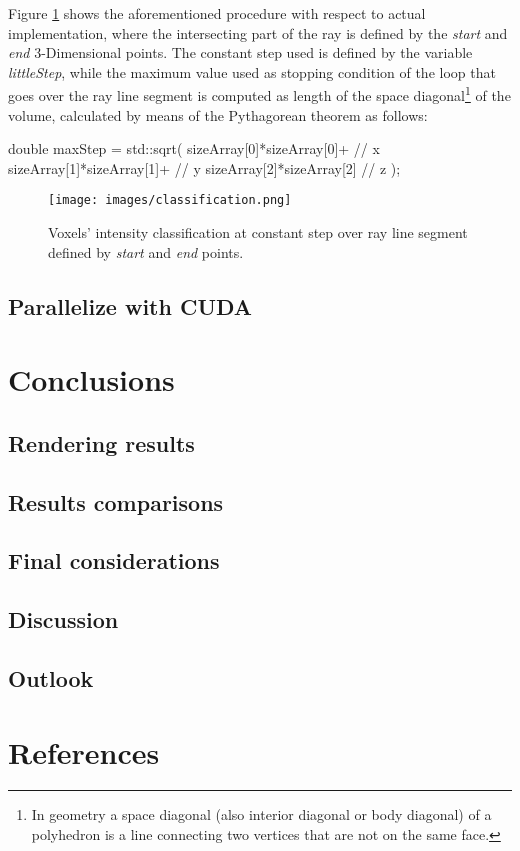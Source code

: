 \documentclass[12pt,a4paper]{extarticle}
\begin{document}
Figure \ref{fig:segmentclassify} shows the aforementioned procedure with respect to actual implementation, where the intersecting part of the ray is defined by the \textit{start} and \textit{end} 3-Dimensional points.
The constant step used is defined by the variable \textit{littleStep}, while the maximum value used as stopping condition of the loop that goes over the ray line segment is computed as length of the space diagonal\footnote{In geometry a space diagonal (also interior diagonal or body diagonal) of a polyhedron is a line connecting two vertices that are not on the same face.\cite{space_diagonal:6}} of the volume, calculated by means of the Pythagorean theorem as follows:  

\begin{cpp}[caption={Computed volume's space diagonal by means of the \textit{"Pythagorean formula"}, where \textit{sizeArray} is an array storing the volume sizes in each 3-Dimensional dimension.}]
double maxStep = std::sqrt(
						sizeArray[0]*sizeArray[0]+ // x
						sizeArray[1]*sizeArray[1]+ // y
						sizeArray[2]*sizeArray[2]  // z
						);
\end{cpp}

\begin{figure}[hbtp]
\centering
\texttt{[image: images/classification.png]}
\caption{Voxels' intensity classification at constant step over ray line segment defined by \textit{start} and \textit{end} points.}
\label{fig:segmentclassify}
\end{figure}

\subsection{Parallelize with CUDA} 
\section{Conclusions} 
\subsection{Rendering results} 
\subsection{Results comparisons} 
\subsection{Final considerations} 
\subsection{Discussion} 
\subsection{Outlook}
\pagebreak
\section*{References}
\nocite{*}
\printbibliography[heading=none]{}
\end{document}
